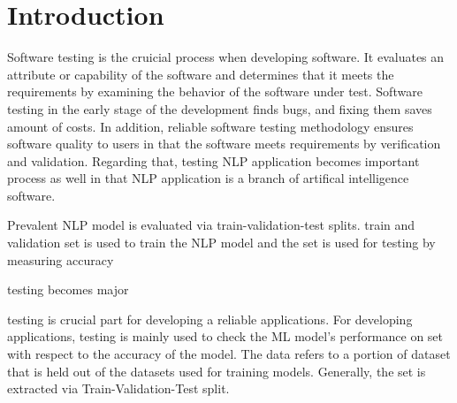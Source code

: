 \section{Introduction}
\label{sec:intro}

Software testing is the cruicial process when developing software.  It
evaluates an attribute or capability of the software and determines
that it meets the requirements by examining the behavior of the
software under test. Software testing in the early stage of the
development finds bugs, and fixing them saves amount of costs. In
addition, reliable software testing methodology ensures software
quality to users in that the software meets requirements by
verification and validation. Regarding that, testing NLP application
becomes important process as well in that NLP application is a branch
of artifical intelligence software.

Prevalent NLP model is evaluated via train-validation-test
splits. train and validation set is used to train the NLP model and
the \ho set is used for testing by measuring accuracy 

testing \ml becomes major 

\Nlp testing is crucial part for developing a reliable \Nlp
applications. For developing \Nlp applications, testing is mainly used
to check the ML model's performance on \ho set with respect to the
accuracy of the model. The \ho data refers to a portion of dataset
that is held out of the datasets used for training \ml
models. Generally, the \ho set is extracted via Train-Validation-Test
split.


